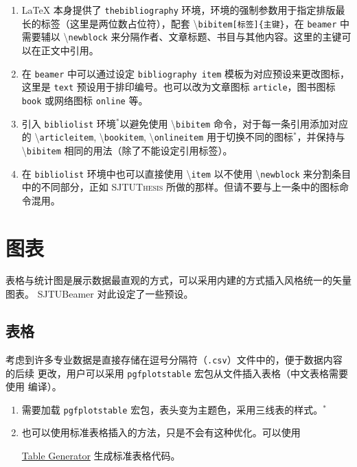 \documentclass[
    UTF8,
    heading=true,
    12pt,
    a4paper
]{ctexrep}
\newenvironment{commentlist}
{\begin{enumerate}\small}
{\end{enumerate}}
\newcommand{\cmd}[1]{\textbackslash{}\texttt{#1}}
\newcommand{\cls}[1]{\texttt{#1}}
\newcommand{\env}[1]{\texttt{#1}}
\newcommand{\pkg}[1]{\texttt{#1}}
\newcommand{\opt}[1]{\texttt{#1}}
\def\themename{\textsf{SJTUBeamer}}
\begin{document}

\begin{commentlist}
  \item \LaTeX{} 本身提供了 \env{thebibliography}
  环境，环境的强制参数用于指定排版最长的标签（这里是两位数占位符），配套
  \cmd{bibitem[标签]\{主键\}}，在 \cls{beamer} 中需要辅以
  \cmd{newblock}
  来分隔作者、文章标题、书目与其他内容。这里的主键可以在正文中引用。
  \item 在 \cls{beamer} 中可以通过设定 \opt{bibliography
    item}
  模板为对应预设来更改图标，这里是 \opt{text}
  预设用于排印编号。也可以改为文章图标 \opt{article}，图书图标
  \opt{book}
  或网络图标 \opt{online} 等。
  \item 引入 \env{bibliolist} 环境$^*$以避免使用
  \cmd{bibitem} 命令，对于每一条引用添加对应的
  \cmd{articleitem},
  \cmd{bookitem}, \cmd{onlineitem}
  用于切换不同的图标$^*$，并保持与 \cmd{bibitem}
  相同的用法（除了不能设定引用标签）。
  \item 在 \env{bibliolist} 环境中也可以直接使用 \cmd{item}
  以不使用 \cmd{newblock} 来分割条目中的不同部分，正如
  \textsc{SJTUThesis} 所做的那样。但请不要与上一条中的图标命令混用。
\end{commentlist}

\chapter{图表}

表格与统计图是展示数据最直观的方式，可以采用内建的方式插入风格统一的矢量图表。
\themename{} 对此设定了一些预设。

\section{表格}

考虑到许多专业数据是直接存储在逗号分隔符（\texttt{.csv}）文件中的，便于数据内容的后续
更改，用户可以采用 \pkg{pgfplotstable} 宏包从文件插入表格（中文表格需要使用
 编译）。


\begin{commentlist}
  \item 需要加载 \pkg{pgfplotstable}
  宏包，表头变为主题色，采用三线表的样式。$^*$
  \item 也可以使用标准表格插入的方法，只是不会有这种优化。可以使用

  \href{https://www.tablesgenerator.com/latex_table
    s}
  {Table Generator} 生成标准表格代码。
\end{commentlist}
\end{document}

